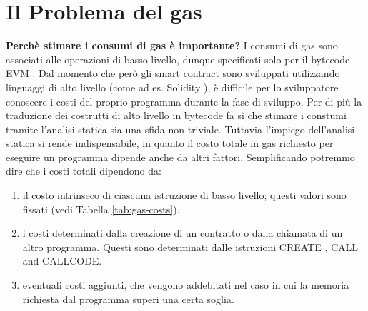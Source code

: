\section{Il Problema del gas}


	\textbf{Perchè stimare i consumi di gas è importante?}\newline
    \newline
	\indent I consumi di gas sono associati alle operazioni di basso livello, 
	dunque specificati solo per il bytecode EVM \cite{wood2014ethereum}. Dal momento che però gli
	smart contract sono sviluppati utilizzando linguaggi di alto livello (come
	ad es. Solidity \cite{ethereum/solidity_2019}), è difficile per lo sviluppatore conoscere i 
	costi del proprio programma durante la fase di sviluppo. Per di più la traduzione 
	dei costrutti di alto livello in bytecode fa sì che stimare i constumi tramite l'analisi 
	statica sia una sfida non triviale. Tuttavia l'impiego dell'analisi statica si rende indispensabile, in quanto il costo totale in gas richiesto per eseguire un programma dipende anche da altri fattori.\newline
	\indent Semplificando potremmo dire che i costi totali dipendono da:
	\begin{enumerate}
	\item il costo intrinseco di ciascuna istruzione di basso livello; questi valori sono fissati (vedi Tabella \ref{tab:gas-costs}).
	\item i costi determinati dalla creazione di un contratto o dalla chiamata di un altro programma. Questi sono determinati dalle istruzioni CREATE , CALL and CALLCODE.
	\item eventuali costi aggiunti, che vengono addebitati nel caso in cui la memoria richiesta dal programma superi una certa soglia.
	\end{enumerate}

